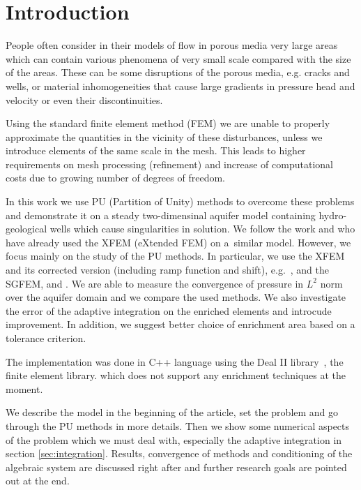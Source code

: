 \documentclass[preprint,12pt,authoryear]{elsarticle}
\begin{document}

\section{Introduction}
\label{sec:introduction}

People often consider in their models of flow in porous media very large areas which can contain various 
phenomena of very small scale compared with the size of the areas. These can be some disruptions of the porous 
media, e.g. cracks and wells, or material inhomogeneities that cause large gradients in pressure head and 
velocity or even their discontinuities.

Using the standard finite element method (FEM) we are unable to properly approximate the quantities in the 
vicinity of these disturbances, unless we introduce elements of the same scale in the mesh. This leads to 
higher requirements on mesh processing (refinement) and increase of computational costs due to growing number  
of degrees of freedom.

In this work we use PU (Partition of Unity) methods to overcome these problems and demonstrate it on a steady 
two-dimensinal aquifer model containing hydro-geological wells which cause singularities in solution. 
We follow the work \cite{gracie} and \cite{craig} who have already used the XFEM (eXtended FEM) on a~similar 
model. However, we focus mainly on the study of the PU methods. In particular, we use the XFEM and its 
corrected version (including ramp function and shift), e.g.~\cite{cxfem}, 
and the SGFEM, \cite{sgfem} and \cite{sgfem2013}. We are able to measure the convergence of pressure in $L^2$ 
norm over the aquifer domain and we compare the used methods. We also investigate the error of the
adaptive integration on the enriched elements and introcude improvement. In addition, we suggest better choice
of enrichment area based on a tolerance criterion.

The implementation was done in C++ language using the Deal II library~\citep{deal}, the finite element library.
which does not support any enrichment techniques at the moment.

We describe the model in the beginning of the article, set the problem and go through the
PU methods in more details. Then we show some numerical aspects of the problem which we must deal with, 
especially the adaptive integration in section \ref{sec:integration}. Results, convergence of methods and
conditioning of the algebraic system are discussed right after and further research goals are pointed out 
at the end. 
\end{document}
